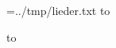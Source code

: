 \documentclass{liederbuch}
\begin{document}
    
    \tableofcontents

    \newread\songs
    \openin\songs=../tmp/lieder.txt
    \read\songs to \currentSong
    \loop\unless\ifeof\songs
    
    \read\songs to \currentSong
    \repeat
    \closein\songs
\end{document}
